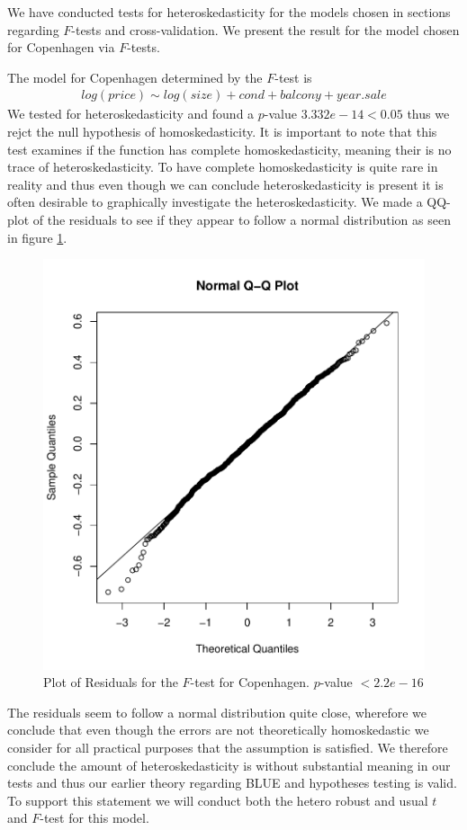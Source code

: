 We have conducted tests for heteroskedasticity for the models chosen in sections regarding $F$-tests and cross-validation.
We present the result for the model chosen for Copenhagen via $F$-tests. 

The model for Copenhagen determined by the $F$-test is
\begin{align}
    log(price) \sim log(size) + cond + balcony + year.sale
\end{align}
We tested for heteroskedasticity and found a $p$-value $ 3.332e-14 < 0.05$ thus we rejct the null hypothesis of homoskedasticity. 
It is important to note that this test examines if the function has complete homoskedasticity, meaning their is no trace of heteroskedasticity. To have complete homoskedasticity is quite rare in reality and thus even though we can conclude heteroskedasticity is present it is often desirable to graphically investigate the heteroskedasticity. 
We made a QQ-plot of the residuals to see if they appear to follow a normal distribution as seen in figure \ref{fig:F_chp_resu}.
\begin{figure}[H]
        \centering
      \includegraphics[width = 0.5 \textwidth]{figures/denheryesyeysyes.pdf}
      \caption{Plot of Residuals for the $F$-test for Copenhagen. $p$-value $< 2.2e-16$}
      \label{fig:F_chp_resu}
\end{figure}
The residuals seem to follow a normal distribution quite close, wherefore we conclude that even though the errors are not theoretically homoskedastic we consider for all practical purposes that the assumption is satisfied.
We therefore conclude the amount of heteroskedasticity is without substantial meaning in our tests and thus our earlier theory regarding BLUE and hypotheses testing is valid. 
To support this statement we will conduct both the hetero robust and usual $t$ and $F$-test for this model.

